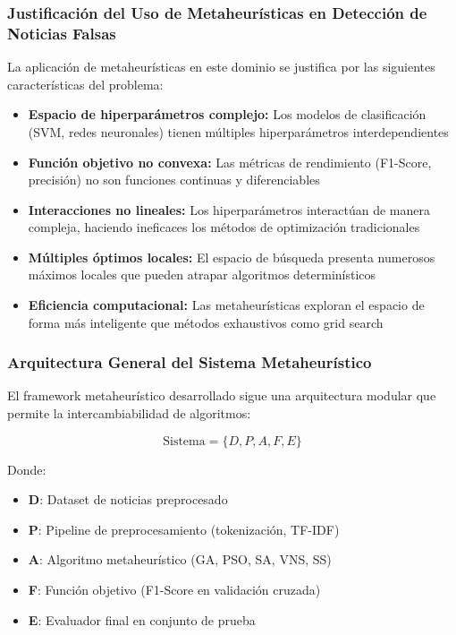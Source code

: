 \subsubsection{Justificación del Uso de Metaheurísticas en Detección de Noticias Falsas}

La aplicación de metaheurísticas en este dominio se justifica por las siguientes características del problema:

\begin{itemize}
    \item \textbf{Espacio de hiperparámetros complejo:} Los modelos de clasificación (SVM, redes neuronales) tienen múltiples hiperparámetros interdependientes
    \item \textbf{Función objetivo no convexa:} Las métricas de rendimiento (F1-Score, precisión) no son funciones continuas y diferenciables
    \item \textbf{Interacciones no lineales:} Los hiperparámetros interactúan de manera compleja, haciendo ineficaces los métodos de optimización tradicionales
    \item \textbf{Múltiples óptimos locales:} El espacio de búsqueda presenta numerosos máximos locales que pueden atrapar algoritmos determinísticos
    \item \textbf{Eficiencia computacional:} Las metaheurísticas exploran el espacio de forma más inteligente que métodos exhaustivos como grid search
\end{itemize}

\subsubsection{Arquitectura General del Sistema Metaheurístico}

El framework metaheurístico desarrollado sigue una arquitectura modular que permite la intercambiabilidad de algoritmos:

\begin{equation}
\text{Sistema} = \{D, P, A, F, E\}
\end{equation}

Donde:
\begin{itemize}
    \item \textbf{D}: Dataset de noticias preprocesado
    \item \textbf{P}: Pipeline de preprocesamiento (tokenización, TF-IDF)
    \item \textbf{A}: Algoritmo metaheurístico (GA, PSO, SA, VNS, SS)
    \item \textbf{F}: Función objetivo (F1-Score en validación cruzada)
    \item \textbf{E}: Evaluador final en conjunto de prueba
\end{itemize}

